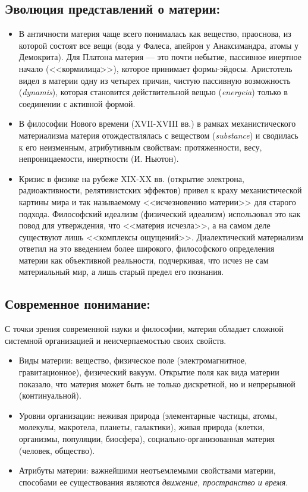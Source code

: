 \documentclass[12pt,a4paper]{article}
\begin{document}
	\subsection{Эволюция представлений о материи:}
	\begin{itemize}
		\item В античности материя чаще всего понималась как вещество, праоснова, из которой состоят все вещи (вода у Фалеса, апейрон у Анаксимандра, атомы у Демокрита). Для Платона материя — это почти небытие, пассивное инертное начало (<<кормилица>>), которое принимает формы-эйдосы. Аристотель видел в материи одну из четырех причин, чистую пассивную возможность (\textit{dynamis}), которая становится действительной вещью (\textit{energeia}) только в соединении с активной формой.
		\item В философии Нового времени (XVII-XVIII вв.) в рамках механистического материализма материя отождествлялась с веществом (\textit{substance}) и сводилась к его неизменным, атрибутивным свойствам: протяженности, весу, непроницаемости, инертности (И. Ньютон).
		\item Кризис в физике на рубеже XIX-XX вв. (открытие электрона, радиоактивности, релятивистских эффектов) привел к краху механистической картины мира и так называемому <<исчезновению материи>> для старого подхода. Философский идеализм (физический идеализм) использовал это как повод для утверждения, что <<материя исчезла>>, а на самом деле существуют лишь <<комплексы ощущений>>. Диалектический материализм ответил на это введением более широкого, философского определения материи как объективной реальности, подчеркивая, что исчез не сам материальный мир, а лишь старый предел его познания.
	\end{itemize}
	
	\subsection{Современное понимание:}
	С точки зрения современной науки и философии, материя обладает сложной системной организацией и неисчерпаемостью своих свойств.
	\begin{itemize}
		\item Виды материи: вещество, физическое поле (электромагнитное, гравитационное), физический вакуум. Открытие поля как вида материи показало, что материя может быть не только дискретной, но и непрерывной (континуальной).
		\item Уровни организации: неживая природа (элементарные частицы, атомы, молекулы, макротела, планеты, галактики), живая природа (клетки, организмы, популяции, биосфера), социально-организованная материя (человек, общество).
		\item Атрибуты материи: важнейшими неотъемлемыми свойствами материи, способами ее существования являются \textit{движение, пространство и время}.
	\end{itemize}
	
\end{document}
